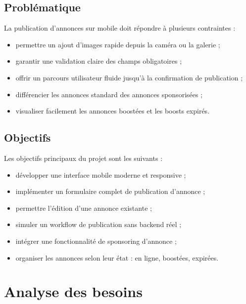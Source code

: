 \documentclass[12pt,a4paper]{report}
\begin{document}
\section{Problématique}
La publication d'annonces sur mobile doit répondre à plusieurs contraintes :
\begin{itemize}
  \item permettre un ajout d'images rapide depuis la caméra ou la galerie ;
  \item garantir une validation claire des champs obligatoires ;
  \item offrir un parcours utilisateur fluide jusqu'à la confirmation de publication ;
  \item différencier les annonces standard des annonces sponsorisées ;
  \item visualiser facilement les annonces boostées et les boosts expirés.
\end{itemize}

\section{Objectifs}
Les objectifs principaux du projet sont les suivants :
\begin{itemize}
  \item développer une interface mobile moderne et responsive ;
  \item implémenter un formulaire complet de publication d'annonce ;
  \item permettre l'édition d'une annonce existante ;
  \item simuler un workflow de publication sans backend réel ;
  \item intégrer une fonctionnalité de sponsoring d'annonce ;
  \item organiser les annonces selon leur état : en ligne, boostées, expirées.
\end{itemize}

\chapter{Analyse des besoins}
\end{document}
